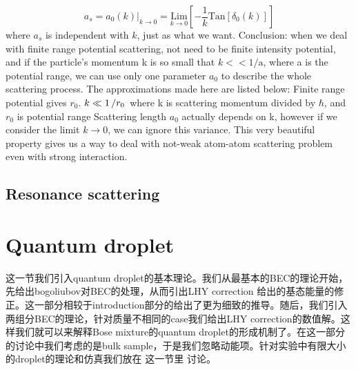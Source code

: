 \begin{equation}
a_s=a_0(k)|_{k\to0}=\underset{k\to0}{\text{Lim}}\left[-\frac{1}{k}\text{Tan}\left[\delta _0(k)\right]\right]
\end{equation}
where $a_s$ is independent with $k$, just as what we want.
Conclusion: when we deal with finite range potential scattering, not need to be finite intensity potential, and if the particle's momentum k is so small that $k<<\text{1/a}$, where a is the potential range, we can use only one parameter $a_0$ to describe the whole scattering process. The approximations made here are listed below:
Finite range potential gives $r_0$.
$k\ll 1\left/r_0 \right.$ where k is scattering momentum divided by $\hbar$, and $r_0$ is potential range
Scattering length $a_0$ actually depends on k, however if we consider the limit $k\to 0$, we can ignore this variance.
This very beautiful property gives us a way to deal with not-weak atom-atom scattering problem even with strong interaction.

\subsection{Resonance scattering}


\section{Quantum droplet}
\label{sec:droplet_ana}

这一节我们引入quantum droplet的基本理论。我们从最基本的BEC的理论开始，先给出bogoliubov对BEC的处理，从而引出LHY correction 给出的基态能量的修正。这一部分相较于introduction部分的给出了更为细致的推导。随后，我们引入两组分BEC的理论，针对质量不相同的case我们给出LHY correction的数值解。这样我们就可以来解释Bose mixture的quantum droplet的形成机制了。在这一部分的讨论中我们考虑的是bulk sample，于是我们忽略动能项。针对实验中有限大小的droplet的理论和仿真我们放在 这一节里 讨论。

